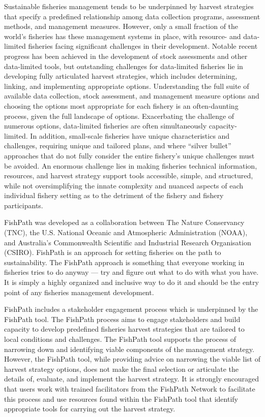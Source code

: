 \documentclass[
  11pt,
]{book}
\begin{document}
Sustainable fisheries management tends to be underpinned by harvest strategies that specify a predefined relationship among data collection programs, assessment methods, and management measures. However, only a small fraction of the world's fisheries has these management systems in place, with resource- and data-limited fisheries facing significant challenges in their development. Notable recent progress has been achieved in the development of stock assessments and other data-limited tools, but outstanding challenges for data-limited fisheries lie in developing fully articulated harvest strategies, which includes determining, linking, and implementing appropriate options. Understanding the full suite of available data collection, stock assessment, and management measure options and choosing the options most appropriate for each fishery is an often-daunting process, given the full landscape of options. Exacerbating the challenge of numerous options, data-limited fisheries are often simultaneously capacity-limited. In addition, small-scale fisheries have unique characteristics and challenges, requiring unique and tailored plans, and where ``silver bullet'' approaches that do not fully consider the entire fishery's unique challenges must be avoided. An enormous challenge lies in making fisheries technical information, resources, and harvest strategy support tools accessible, simple, and structured, while not oversimplifying the innate complexity and nuanced aspects of each individual fishery setting as to the detriment of the fishery and fishery participants.

FishPath was developed as a collaboration between The Nature Conservancy (TNC), the U.S. National Oceanic and Atmospheric Administration (NOAA), and Australia's Commonwealth Scientific and Industrial Research Organisation (CSIRO). FishPath is an approach for setting fisheries on the path to sustainability. The FishPath approach is something that everyone working in fisheries tries to do anyway --- try and figure out what to do with what you have. It is simply a highly organized and inclusive way to do it and should be the entry point of any fisheries management development.

FishPath includes a stakeholder engagement process which is underpinned by the FishPath tool. The FishPath process aims to engage stakeholders and build capacity to develop predefined fisheries harvest strategies that are tailored to local conditions and challenges. The FishPath tool supports the process of narrowing down and identifying viable components of the management strategy. However, the FishPath tool, while providing advice on narrowing the viable list of harvest strategy options, does not make the final selection or articulate the details of, evaluate, and implement the harvest strategy. It is strongly encouraged that users work with trained facilitators from the FishPath Network to facilitate this process and use resources found within the FishPath tool that identify appropriate tools for carrying out the harvest strategy.
\end{document}
